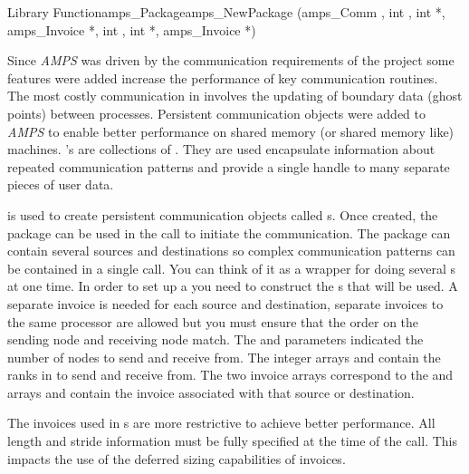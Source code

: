 \begin{deftypefn}{Library Function}{amps_Package}{amps\_NewPackage}
(amps_Comm , int , int *,
amps_Invoice *, int , int
*, amps_Invoice *)

\DESCRIPTION

Since {\em AMPS} was driven by the communication requirements of the
\parflow{} project some features were added increase the
performance of key \parflow{} communication routines.  The most
costly communication in \parflow{} involves the updating of
boundary data (ghost points) between processes.  Persistent
communication objects were added to {\em AMPS} to enable better
performance on shared memory (or shared memory like) machines.
's are collections of .  They
are used encapsulate information about repeated communication patterns
and provide a single handle to many separate pieces of user data.

 is used to create persistent communication
objects called s.  Once created, the package can be
used in the  call to initiate the
communication.  The package can contain several sources and
destinations so complex communication patterns can be contained in a
single call.  You can think of it as a wrapper for doing several
s at one time.  In order to set up a
 you need to construct the s
that will be used.  A separate invoice is needed for each source and
destination, separate invoices to the same processor are allowed but
you must ensure that the order on the sending node and receiving node
match.  The  and  parameters indicated
the number of nodes to send and receive from.  The integer arrays
 and  contain the ranks in  to send and
receive from.  The two invoice arrays correspond to the 
and  arrays and contain the invoice associated with that
source or destination.

The invoices used in s are more restrictive to
achieve better performance.  All length and stride information must be
fully specified at the time of the  call.  This
impacts the use of the deferred sizing capabilities of invoices.  


\end{deftypefn}

